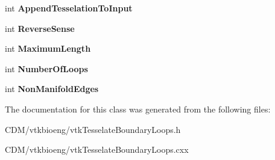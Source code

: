 \begin{DoxyCompactItemize}
\item 
\hypertarget{classvtkTesselateBoundaryLoops_a2fc679c30bbfdf3fa9040447d9ffa888}{
int {\bfseries AppendTesselationToInput}}
\label{classvtkTesselateBoundaryLoops_a2fc679c30bbfdf3fa9040447d9ffa888}

\item 
\hypertarget{classvtkTesselateBoundaryLoops_a6d9eac7d7118c7f305e7cd4984e3ef32}{
int {\bfseries ReverseSense}}
\label{classvtkTesselateBoundaryLoops_a6d9eac7d7118c7f305e7cd4984e3ef32}

\item 
\hypertarget{classvtkTesselateBoundaryLoops_ab0a4ca599a3ad059e43fb54ab7867095}{
int {\bfseries MaximumLength}}
\label{classvtkTesselateBoundaryLoops_ab0a4ca599a3ad059e43fb54ab7867095}

\item 
\hypertarget{classvtkTesselateBoundaryLoops_af016b00631b24a85b72128c3931139c2}{
int {\bfseries NumberOfLoops}}
\label{classvtkTesselateBoundaryLoops_af016b00631b24a85b72128c3931139c2}

\item 
\hypertarget{classvtkTesselateBoundaryLoops_a34d1fa67e5c7a197d3a16714313560d7}{
int {\bfseries NonManifoldEdges}}
\label{classvtkTesselateBoundaryLoops_a34d1fa67e5c7a197d3a16714313560d7}

\end{DoxyCompactItemize}


The documentation for this class was generated from the following files:\begin{DoxyCompactItemize}
\item 
CDM/vtkbioeng/vtkTesselateBoundaryLoops.h\item 
CDM/vtkbioeng/vtkTesselateBoundaryLoops.cxx\end{DoxyCompactItemize}
